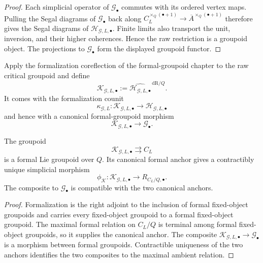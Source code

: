 \begin{proof}
Each simplicial operator of $\mathcal G_\bullet$ commutes with its ordered
vertex maps.  Pulling the Segal diagrams of $\mathcal G_\bullet$ back along
$C_L^{\times_Q(\bullet+1)}\to
\overline A^{\times_Q(\bullet+1)}$ therefore gives the Segal diagrams of
$\mathcal H_{\mathcal G,L,\bullet}$.  Finite limits also transport the unit,
inversion, and their higher coherences.  Hence the raw restriction is a
groupoid object.  The projections to $\mathcal G_\bullet$ form the displayed
groupoid functor.
\end{proof}

\begin{construction}
\label{constr:symmetry-noether-canonical-critical-formalization}
Apply the formalization coreflection of the formal-groupoid chapter to the
raw critical groupoid and define
\[
\boxed{
\mathcal K_{\mathcal G,L,\bullet}
:=
\widehat{\mathcal H_{\mathcal G,L,\bullet}}^{\,\mathrm{dR}/Q}.
}
\]
It comes with the formalization counit
\[
\kappa_{\mathcal G,L}:
\mathcal K_{\mathcal G,L,\bullet}
\longrightarrow
\mathcal H_{\mathcal G,L,\bullet}
\]
and hence with a canonical formal-groupoid morphism
\[
\mathcal K_{\mathcal G,L,\bullet}
\longrightarrow
\mathcal G_\bullet.
\]
\end{construction}

\begin{theorem}
\label{thm:symmetry-noether-critical-formal-symmetry}
The groupoid
\[
\mathcal K_{\mathcal G,L,\bullet}
\rightrightarrows C_L
\]
is a formal Lie groupoid over $Q$.  Its canonical formal anchor gives a
contractibly unique simplicial morphism
\[
\phi_{\mathcal K}:
\mathcal K_{\mathcal G,L,\bullet}
\longrightarrow
R_{C_L/Q,\bullet}.
\]
The composite to $\mathcal G_\bullet$ is compatible with the two canonical
anchors.
\end{theorem}

\begin{proof}
Formalization is the right adjoint to the inclusion of formal fixed-object
groupoids and carries every fixed-object groupoid to a formal fixed-object
groupoid.  The maximal formal relation on $C_L/Q$ is terminal among formal
fixed-object groupoids, so it supplies the canonical anchor.  The composite
$\mathcal K_{\mathcal G,L,\bullet}\to\mathcal G_\bullet$ is a morphism
between formal groupoids.  Contractible uniqueness of the two anchors
identifies the two composites to the maximal ambient relation.
\end{proof}

